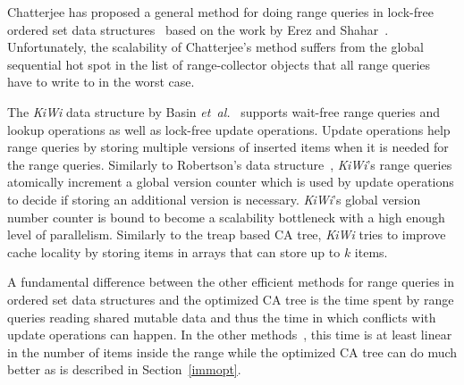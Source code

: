 \documentclass[a4paper,UKenglish]{oasics}
\newcommand{\etal}{\mbox{\textit{et al.}}\xspace}
\begin{document}
Chatterjee has proposed a general method for doing range queries in lock-free ordered set data structures~\cite{ChatterjeeLFRangeQueries} based on the work by Erez and Shahar~\cite{Petrank2013}.
Unfortunately, the scalability of Chatterjee's method suffers from the global sequential hot spot in the list of range-collector objects that all range queries have to write to in the worst case. 

The \emph{KiWi} data structure by Basin \etal~\cite{BasinKiWi} supports wait-free range queries and lookup operations as well as lock-free update operations. %
Update operations help range queries by storing multiple versions of inserted items when it is needed for the range queries.
Similarly to Robertson's data structure~\cite{CFRangeQueries}, \emph{KiWi}'s range queries atomically increment a global version counter which is used by update operations to decide if storing an additional version is necessary.
\emph{KiWi}'s global version number counter is bound to become a scalability bottleneck with a high enough level of parallelism. %
Similarly to the treap based CA tree, \emph{KiWi} tries to improve cache locality by storing items in arrays that can store up to $k$ items.

A fundamental difference between the other efficient methods for range queries in ordered set data structures and the optimized CA tree is the time spent by range queries reading shared mutable data and thus the time in which conflicts with update operations can happen.
In the other methods~\cite{RangeQKArySeachTree,AvniLeaplist,CFRangeQueries,CATreeLCPC,ChatterjeeLFRangeQueries,BasinKiWi}, this time is at least linear in the number of items inside the range while the optimized CA tree can do much better as is described in Section~\ref{immopt}.

\end{document}
